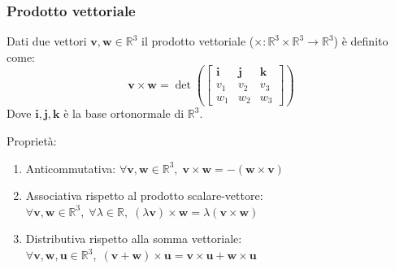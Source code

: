 \documentclass{article}
\begin{document}
    \subsubsection{Prodotto vettoriale} \label{subsubsec:vscross}
        Dati due vettori $\mathbf{v}, \mathbf{w} \in \mathbb{R}^3$ il prodotto vettoriale ($\times : \mathbb{R}^3 \times \mathbb{R}^3 \rightarrow \mathbb{R}^3$) è definito come:
        \[
            \mathbf{v} \times \mathbf{w} = \det \left( 
            \begin{bmatrix}
                \mathbf{i} & \mathbf{j} & \mathbf{k} \\
                v_1 & v_2 & v_3 \\
                w_1 & w_2 & w_3
            \end{bmatrix}
            \right)
        \]
        Dove $\mathbf{i}, \mathbf{j}, \mathbf{k}$ è la base ortonormale di $\mathbb{R}^3$. 

        \vspace{5pt}
        Proprietà:
        \begin{enumerate}[label=(\arabic*)]
            \item Anticommutativa: $\forall \mathbf{v}, \mathbf{w} \in \mathbb{R}^3, \; \mathbf{v} \times \mathbf{w} = -(\mathbf{w} \times \mathbf{v})$ 
            \item Associativa rispetto al prodotto scalare-vettore: $\forall \mathbf{v}, \mathbf{w} \in \mathbb{R}^3, \; \forall \lambda \in \mathbb{R}, \; (\lambda\mathbf{v}) \times \mathbf{w} = \lambda(\mathbf{v} \times \mathbf{w})$
            \item Distributiva rispetto alla somma vettoriale: $\forall \mathbf{v}, \mathbf{w}, \mathbf{u} \in \mathbb{R}^3, \; (\mathbf{v} + \mathbf{w}) \times \mathbf{u} = \mathbf{v} \times \mathbf{u} + \mathbf{w} \times \mathbf{u}$
        \end{enumerate}
    
\end{document}
